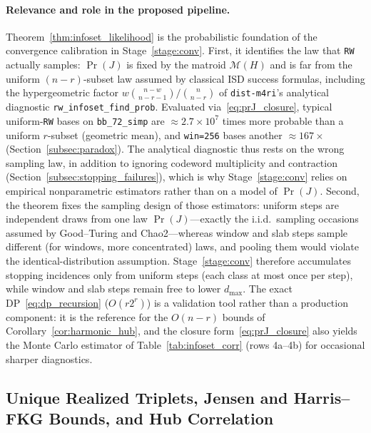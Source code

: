\documentclass[12pt]{article}
\theoremstyle{definition}
\newcommand{\ttt}[1]{\texttt{#1}}
\begin{document}
\paragraph{Relevance and role in the proposed pipeline.}
Theorem~\ref{thm:infoset_likelihood} is the probabilistic foundation of the convergence calibration in
Stage~\ref{stage:conv}. First, it identifies the law that \ttt{RW} actually samples: $\Pr(J)$ is fixed by the matroid
$\mathcal{M}(H)$ and is far from the uniform $(n - r)$-subset law assumed by classical ISD success formulas, including
the hypergeometric factor $w\binom{n-w}{n-r-1}/\binom{n}{n-r}$ of \ttt{dist-m4ri}'s analytical diagnostic
\ttt{rw\_infoset\_find\_prob}. Evaluated via~\eqref{eq:prJ_closure}, typical uniform-\ttt{RW} bases on
\ttt{bb\_72\_simp} are $\approx 2.7 \times 10^7$ times more probable than a uniform $r$-subset (geometric mean), and
\ttt{win=256} bases another $\approx 167\times$ (Section~\ref{subsec:paradox}). The analytical diagnostic thus rests
on the wrong sampling law, in addition to ignoring codeword multiplicity and contraction
(Section~\ref{subsec:stopping_failures}), which is why Stage~\ref{stage:conv} relies on empirical nonparametric
estimators rather than on a model of $\Pr(J)$. Second, the theorem fixes the sampling design of those estimators:
uniform steps are independent draws from one law $\Pr(J)$---exactly the i.i.d.\ sampling occasions assumed by
Good--Turing and Chao2---whereas window and slab steps sample different (for windows, more concentrated) laws, and
pooling them would violate the identical-distribution assumption. Stage~\ref{stage:conv} therefore accumulates
stopping incidences only from uniform steps (each class at most once per step), while window and slab steps remain
free to lower
$d_{\max}$. The exact DP~\eqref{eq:dp_recursion} ($O(r 2^r)$) is a validation tool rather than a production
component: it is the reference for the $O(n - r)$ bounds of Corollary~\ref{cor:harmonic_hub}, and the closure
form~\eqref{eq:prJ_closure} also yields the Monte Carlo estimator of Table~\ref{tab:infoset_corr} (rows 4a--4b) for
occasional sharper diagnostics.

\subsection{Unique Realized Triplets, Jensen and Harris\texorpdfstring{--}{-}FKG Bounds, and Hub
  Correlation}\label{subsec:cor_harmonic}
\end{document}
